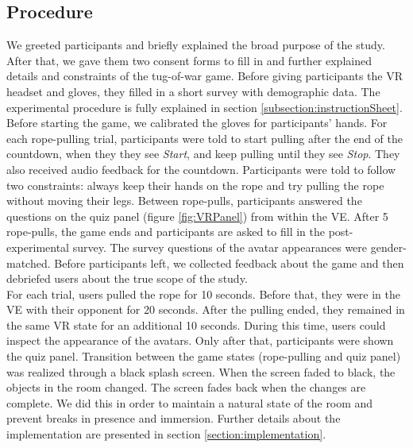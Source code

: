 \subsection{Procedure}
We greeted participants and briefly explained the broad purpose of the study. After that, we gave them two consent forms to fill in and further explained details and constraints of the tug-of-war game. Before giving participants the VR headset and gloves, they filled in a short survey with demographic data. The experimental procedure is fully explained in section \ref{subsection:instructionSheet}.
\\
Before starting the game, we calibrated the gloves for participants' hands. For each rope-pulling trial, participants were told to start pulling after the end of the countdown, when they they see \textit{Start}, and keep pulling until they see \textit{Stop}. They also received audio feedback for the countdown. Participants were told to follow two constraints: always keep their hands on the rope and try pulling the rope without moving their legs. Between rope-pulls, participants answered the questions on the quiz panel (figure \ref{fig:VRPanel}) from within the VE. After 5 rope-pulls, the game ends and participants are asked to fill in the post-experimental survey. The survey questions of the avatar appearances were gender-matched. Before participants left, we collected feedback about the game and then debriefed users about the true scope of the study.\\
For each trial, users pulled the rope for 10 seconds. Before that, they were in the VE with their opponent for 20 seconds. After the pulling ended, they remained in the same VR state for an additional 10 seconds. During this time, users could inspect the appearance of the avatars. Only after that, participants were shown the quiz panel. Transition between the game states (rope-pulling and quiz panel) was realized through a black splash screen. When the screen faded to black, the objects in the room changed. The screen fades back when the changes are complete. We did this in order to maintain a natural state of the room and prevent breaks in presence and immersion. Further details about the implementation are presented in section \ref{section:implementation}.\\
